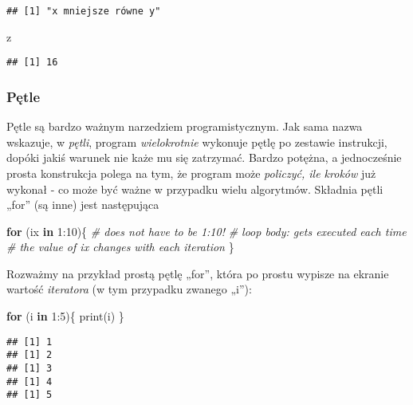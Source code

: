 \documentclass[
]{article}
\newenvironment{Shaded}{\begin{snugshade}}{\end{snugshade}}
\newcommand{\CommentTok}[1]{\textcolor[rgb]{0.56,0.35,0.01}{\textit{#1}}}
\newcommand{\ControlFlowTok}[1]{\textcolor[rgb]{0.13,0.29,0.53}{\textbf{#1}}}
\newcommand{\DecValTok}[1]{\textcolor[rgb]{0.00,0.00,0.81}{#1}}
\newcommand{\FunctionTok}[1]{\textcolor[rgb]{0.00,0.00,0.00}{#1}}
\newcommand{\NormalTok}[1]{#1}
\newcommand{\SpecialCharTok}[1]{\textcolor[rgb]{0.00,0.00,0.00}{#1}}
\begin{document}
\begin{verbatim}
## [1] "x mniejsze równe y"
\end{verbatim}

\begin{Shaded}
\begin{Highlighting}[]
\NormalTok{z}
\end{Highlighting}
\end{Shaded}

\begin{verbatim}
## [1] 16
\end{verbatim}

\hypertarget{pux119tle}{%
\subsubsection{Pętle}\label{pux119tle}}

Pętle są bardzo ważnym narzedziem programistycznym. Jak sama nazwa
wskazuje, w \emph{pętli}, program \emph{wielokrotnie} wykonuje pętlę po
zestawie instrukcji, dopóki jakiś warunek nie każe mu się zatrzymać.
Bardzo potężna, a jednocześnie prosta konstrukcja polega na tym, że
program może \emph{policzyć, ile kroków} już wykonał - co może być ważne
w przypadku wielu algorytmów. Składnia pętli „for'' (są inne) jest
następująca

\begin{Shaded}
\begin{Highlighting}[]
\ControlFlowTok{for}\NormalTok{ (ix }\ControlFlowTok{in} \DecValTok{1}\SpecialCharTok{:}\DecValTok{10}\NormalTok{)\{   }\CommentTok{\# does not have to be 1:10!}
  \CommentTok{\# loop body: gets executed each time}
  \CommentTok{\# the value of ix changes with each iteration}
\NormalTok{\}}
\end{Highlighting}
\end{Shaded}

Rozważmy na przykład prostą pętlę „for'', która po prostu wypisze na
ekranie wartość \emph{iteratora} (w tym przypadku zwanego „i''):

\begin{Shaded}
\begin{Highlighting}[]
\ControlFlowTok{for}\NormalTok{ (i }\ControlFlowTok{in} \DecValTok{1}\SpecialCharTok{:}\DecValTok{5}\NormalTok{)\{}
  \FunctionTok{print}\NormalTok{(i)}
\NormalTok{\}}
\end{Highlighting}
\end{Shaded}

\begin{verbatim}
## [1] 1
## [1] 2
## [1] 3
## [1] 4
## [1] 5
\end{verbatim}
\end{document}
